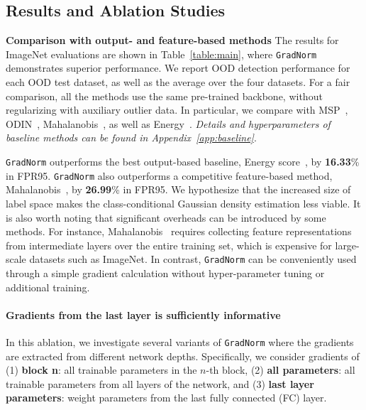 \documentclass{article}
\begin{document}
\vspace{-0.2cm}
\subsection{Results and Ablation Studies}
\label{sec:ablations}
\vspace{-0.2cm}
\textbf{Comparison with output- and feature-based methods} 
The results for ImageNet evaluations are shown in Table~\ref{table:main}, where \texttt{GradNorm} demonstrates  superior performance. We report OOD detection performance for each OOD test dataset, as well as the average over the four datasets. For a fair comparison, all the methods use the same pre-trained backbone, without regularizing with auxiliary outlier data. 
In particular, we compare with MSP~\cite{hendrycks2016baseline}, ODIN~\cite{liang2018enhancing}, Mahalanobis~\cite{lee2018simple}, as well as Energy~\cite{liu2020energy}.
\emph{Details and hyperparameters of baseline methods can be found in Appendix~\ref{app:baseline}}. 

\texttt{GradNorm} outperforms the best output-based baseline, Energy score~\cite{liu2020energy}, by \textbf{16.33}\% in FPR95. \texttt{GradNorm} also outperforms a competitive feature-based method, Mahalanobis~\cite{lee2018simple}, by \textbf{26.99}\% in FPR95. We hypothesize that the increased size of label space makes the class-conditional Gaussian density estimation less viable. It is also worth noting that significant overheads can be introduced by some methods. 
For instance, Mahalanobis~\cite{lee2018simple} requires collecting feature representations from intermediate layers over the entire training set, which is expensive for large-scale datasets such as ImageNet. 
In contrast, \texttt{GradNorm} can be conveniently used through a simple gradient calculation without hyper-parameter tuning or additional training.
































\paragraph{Gradients from the last layer is sufficiently informative} 
In this ablation, we investigate several variants of \texttt{GradNorm} where the gradients are extracted from different network depths. Specifically, we consider gradients of (1) \textbf{block n}: all trainable parameters in the $n$-th block, (2) \textbf{all parameters}: all trainable parameters from all layers of the network, and (3) \textbf{last layer parameters}: weight parameters from the last fully connected (FC) layer. 
\end{document}
